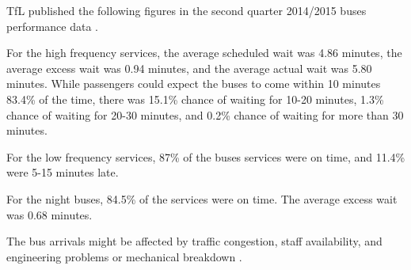 \par TfL published the following figures in the second quarter 2014/2015 buses performance data \cite{buses_performance_report}.

\par For the high frequency services, the average scheduled wait was 4.86 minutes, the average excess wait was 0.94 minutes, and the average actual wait was 5.80 minutes. While passengers could expect the buses to come within 10 minutes 83.4\% of the time, there was 15.1\% chance of waiting for 10-20 minutes, 1.3\% chance of waiting for 20-30 minutes, and 0.2\% chance of waiting for more than 30 minutes.

\par For the low frequency services, 87\% of the buses services were on time, and 11.4\% were 5-15 minutes late.

\par For the night buses, 84.5\% of the services were on time. The average excess wait was 0.68 minutes.


\par The bus arrivals might be affected by traffic congestion, staff availability, and engineering problems or mechanical breakdown \cite{buses_performance_data}.
